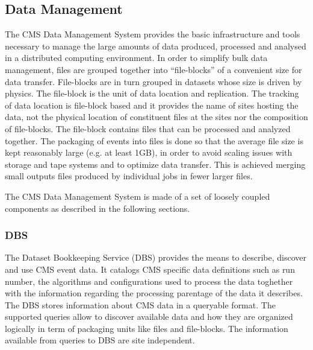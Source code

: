 \subsection{Data Management}
\label{sec:3_1}
The CMS Data Management System provides the basic infrastructure and tools necessary to manage the large amounts of data produced, processed and analysed in a distributed computing environment. 
In order to simplify bulk data management, files are grouped together into “file-blocks”  of a convenient size for data transfer. %
File-blocks are in turn grouped in datasets whose size is driven by physics.
The file-block is the unit of data location and replication. 
The tracking of data location is file-block based and it provides the name of sites hosting the data, not the physical location of constituent files at the sites nor the composition of file-blocks.
The file-block contains files that can be processed and analyzed together.
The packaging of events into files is done so that the average file size is
kept reasonably large (e.g. at least 1GB), in order to avoid scaling issues with storage and tape systems and to optimize data transfer.
This is achieved merging small outputs files produced by individual jobs in fewer larger files.

The CMS Data Management System is made of a set of loosely coupled components as described in the following sections.
\subsubsection{DBS}
\label{sec:3_1_1}
The Dataset Bookkeeping Service (DBS)\cite{RefDBS} provides the means to describe, discover and use CMS event data. 
It catalogs CMS specific data definitions such as run number, the algorithms and configurations used to process the data toghether with the information regarding the processing parentage of the data it describes.
The DBS stores information about CMS data in a queryable format. The supported queries allow to discover available data and how they are organized logically in term of packaging units like files and file-blocks. The information available from queries to DBS are site independent.

